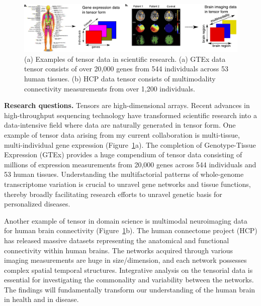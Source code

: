\documentclass[11pt]{article}
\theoremstyle{plain}
\theoremstyle{definition}
\begin{document}
\begin{figure}[H]
\begin{center}
\includegraphics[width=1\textwidth]{example.pdf}
\caption{ \small (a) Examples of tensor data in scientific research. (a) GTEx data tensor consists of over 20,000 genes from 544 individuals across 53 human tissues. (b) HCP data tensor consists of multimodality connectivity measurements from over 1,200 individuals.}\label{fig:0}
\end{center}
\end{figure} 
\vspace{-.6cm}

{\bf Research questions.} Tensors are high-dimensional arrays. Recent advances in high-throughput sequencing technology have transformed scientific research into a data-intensive field where data are naturally generated in tensor form. One example of tensor data arising from my current collaboration is multi-tissue, multi-individual gene expression (Figure~\ref{fig:0}a). The completion of Genotype-Tissue Expression (GTEx) provides a huge compendium of tensor data consisting of millions of expression measurements from 20,000 genes across 544 individuals and 53 human tissues. Understanding the multifactorial patterns of whole-genome transcriptome variation is crucial to unravel gene networks and tissue functions, thereby broadly facilitating research efforts to unravel genetic basis for personalized diseases.

Another example of tensor in domain science is multimodal neuroimaging data for human brain connectivity (Figure~\ref{fig:0}b). The human connectome project (HCP) has released massive datasets representing the anatomical and functional connectivity within human brains. The networks acquired through various imaging measurements are huge in size/dimension, and each network possesses complex spatial temporal structures. Integrative analysis on the tensorial data is essential for investigating the commonality and variability between the networks. The findings will fundamentally transform our understanding of the human brain in health and in disease.
\end{document}
